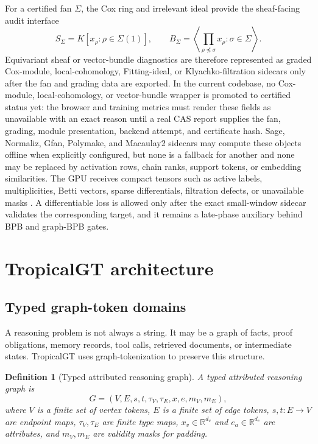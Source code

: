 \documentclass[11pt]{article}
\newtheorem{definition}{Definition}[section]
\newcommand{\R}{\mathbb{R}}
\begin{document}
For a certified fan $\Sigma$, the Cox ring and irrelevant ideal provide the sheaf-facing audit interface
\[
  S_\Sigma=K[x_\rho:\rho\in\Sigma(1)],\qquad
  B_\Sigma=\left\langle\prod_{\rho\not\preceq\sigma}x_\rho:\sigma\in\Sigma\right\rangle.
\]
Equivariant sheaf or vector-bundle diagnostics are therefore represented as graded Cox-module, local-cohomology, Fitting-ideal, or Klyachko-filtration sidecars only after the fan and grading data are exported.  In the current codebase, no Cox-module, local-cohomology, or vector-bundle wrapper is promoted to certified status yet: the browser and training metrics must render these fields as unavailable with an exact reason until a real CAS report supplies the fan, grading, module presentation, backend attempt, and certificate hash.  Sage, Normaliz, Gfan, Polymake, and Macaulay2 sidecars may compute these objects offline when explicitly configured, but none is a fallback for another and none may be replaced by activation rows, chain ranks, support tokens, or embedding similarities.  The GPU receives compact tensors such as active labels, multiplicities, Betti vectors, sparse differentials, filtration defects, or unavailable masks \cite{m2tropical2019}.  A differentiable loss is allowed only after the exact small-window sidecar validates the corresponding target, and it remains a late-phase auxiliary behind BPB and graph-BPB gates.

\section{TropicalGT architecture}

\subsection{Typed graph-token domains}

A reasoning problem is not always a string.  It may be a graph of facts, proof obligations, memory records, tool calls, retrieved documents, or intermediate states.  TropicalGT uses graph-tokenization to preserve this structure.

\begin{definition}[Typed attributed reasoning graph]
A typed attributed reasoning graph is
\begin{equation}
G=(V,E,s,t,\tau_V,\tau_E,x,e,m_V,m_E),
\end{equation}
where \(V\) is a finite set of vertex tokens, \(E\) is a finite set of edge tokens, \(s,t:E\to V\) are endpoint maps, \(\tau_V,\tau_E\) are finite type maps, \(x_v\in\R^{d_v}\) and \(e_a\in\R^{d_e}\) are attributes, and \(m_V,m_E\) are validity masks for padding.
\end{definition}
\end{document}
